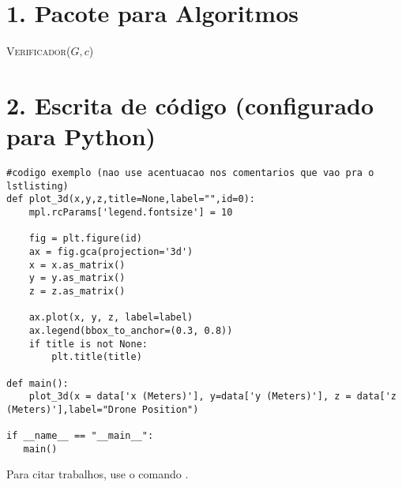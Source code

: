 \documentclass[Portugues]{ic-tese-v3}
\begin{document}


\mestrado

\paginasiniciais

\fimdaspaginasiniciais

\chapter*{1. Pacote para Algoritmos}
\begin{algorithm}[ht]
   \SetAlgoLined
   \label{alg2}
   \caption{\textsc{Verificador($G,c$)}
   }
\end{algorithm}

\chapter*{2. Escrita de código (configurado para Python)}
\begin{lstlisting}
#codigo exemplo (nao use acentuacao nos comentarios que vao pra o lstlisting)
def plot_3d(x,y,z,title=None,label="",id=0):
    mpl.rcParams['legend.fontsize'] = 10

    fig = plt.figure(id)
    ax = fig.gca(projection='3d')
    x = x.as_matrix()
    y = y.as_matrix()
    z = z.as_matrix()

    ax.plot(x, y, z, label=label)
    ax.legend(bbox_to_anchor=(0.3, 0.8))
    if title is not None:
        plt.title(title)

def main():
    plot_3d(x = data['x (Meters)'], y=data['y (Meters)'], z = data['z (Meters)'],label="Drone Position")
    
if __name__ == "__main__":
   main() 
\end{lstlisting}

Para citar trabalhos, use o comando \cite{lopes2014elastic}. 

\newpage


\end{document}
